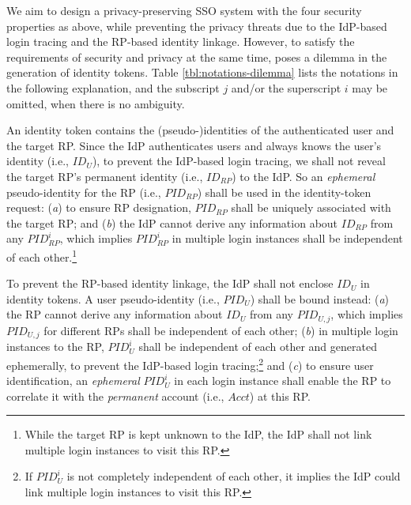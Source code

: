 We aim to design a privacy-preserving SSO system with the four security properties as above,
    while preventing the privacy threats due to the IdP-based login tracing and the RP-based identity linkage.
However, to satisfy the requirements of security and privacy at the same time,
     poses a dilemma in the generation of identity tokens.
Table \ref{tbl:notations-dilemma} lists the notations in the following explanation,
    and the subscript $j$ and/or the superscript $i$ may be omitted, when there is no ambiguity.

An identity token contains the (pseudo-)identities of the authenticated user and the target RP. %
Since the IdP authenticates users and always knows the user's identity (i.e., $ID_U$),
    to prevent the IdP-based login tracing,
    we shall not reveal the target RP's permanent identity (i.e., $ID_{RP}$) to the IdP.
So an \emph{ephemeral} pseudo-identity for the RP (i.e., $PID_{RP}$) shall be used in the identity-token request:
(\emph{a}) to ensure RP designation,
     $PID_{RP}$ shall be uniquely associated with the target RP;
    and (\emph{b}) the IdP cannot derive any information about $ID_{RP}$ from any $PID_{RP}^i$,
        which implies $PID_{RP}^i$ in multiple login instances shall
         be independent of each other.\footnote{While the target RP is kept unknown to the IdP,
            the IdP shall not link multiple login instances to visit this RP.}

To prevent the RP-based identity linkage,
 the IdP shall not enclose $ID_U$ in identity tokens.
A user pseudo-identity (i.e., $PID_U$) shall be bound instead:
    (\emph{a}) the RP cannot derive any information about $ID_U$ from any $PID_{U,j}$,
    which implies $PID_{U,j}$ for different RPs shall be independent of each other;
    (\emph{b}) in multiple login instances to the RP, $PID_U^i$ shall be independent of each other and generated ephemerally,
        to prevent the IdP-based login tracing;\footnote{If $PID_U^i$ is not completely independent of each other,
         it implies the IdP could link multiple login instances to visit this RP.}
    and (\emph{c}) to ensure user identification,
    an \emph{ephemeral} $PID_{U}^i$ in each login instance shall enable the RP to correlate it
     with the \emph{permanent} account  (i.e., $Acct$) at this RP.


